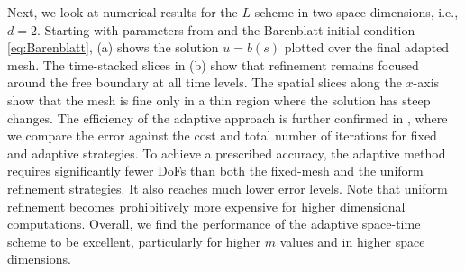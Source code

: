 \documentclass[review,11pt]{article}
\numberwithin{equation}{section}
\begin{document}
Next, we look at numerical results for the $L$-scheme in two space dimensions, i.e., $d=2$. Starting with parameters from  and the Barenblatt initial condition \eqref{eq:Barenblatt},
 (a) shows the solution $u=b(s)$ plotted over the final adapted mesh. 
The time-stacked slices in  (b) show that refinement remains focused around the free boundary at all time levels. The spatial slices along the $x$-axis show that the mesh is fine only in a thin region where the solution has steep changes. The efficiency of the adaptive approach is further confirmed in , where we compare the error against the cost and total number of iterations for fixed and adaptive strategies.  To achieve a prescribed accuracy, the adaptive method requires significantly fewer DoFs than both the fixed-mesh and the uniform refinement strategies. It also reaches much lower error levels. Note that uniform refinement becomes prohibitively more expensive for higher dimensional computations. Overall, we find the performance of the adaptive space-time scheme to be excellent, particularly for higher $m$ values and in higher space dimensions.
\end{document}
